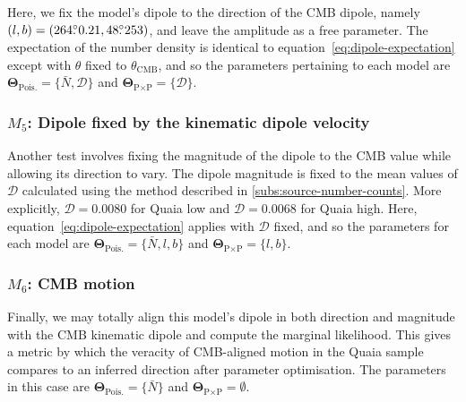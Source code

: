 \documentclass[fleqn,usenatbib]{mnras}
\newcommand{\dotdeg}{\rlap{.}^\circ}
\begin{document}
        Here, we fix the model's dipole to the direction of the CMB dipole, namely $(l,b) = (264\dotdeg0.21, 48\dotdeg253)$, and leave the amplitude as a free parameter. 
        The expectation of the number density is identical to equation~\eqref{eq:dipole-expectation} except with $\theta$ fixed to $\theta_\text{CMB}$, and so the parameters pertaining to each model are $\mathbf{\Theta}_{\text{Pois.}} = \{ \bar{N}, \mathcal{D} \}$ and $\mathbf{\Theta}_{\text{P}\times\text{P}} = \{ \mathcal{D} \}$.
        
    \subsubsection{$M_5$: Dipole fixed by the kinematic dipole velocity}
        \label{subs:direction}
        Another test involves fixing the magnitude of the dipole to the CMB value while allowing its direction to vary. 
        The dipole magnitude is fixed to the mean values of $\mathcal{D}$ calculated using the method described in \ref{subs:source-number-counts}.
        More explicitly,  $\mathcal{D} =  0.0080$ for Quaia low and $\mathcal{D} =  0.0068$ for Quaia high.
        Here, equation~\eqref{eq:dipole-expectation} applies with $\mathcal{D}$ fixed, and so the parameters for each model are $\mathbf{\Theta}_{\text{Pois.}} = \{ \bar{N}, l, b \}$ and $\mathbf{\Theta}_{\text{P}\times\text{P}} = \{ l, b \}$.

    \subsubsection{$M_6$: CMB motion}
        \label{subs:cmb-motion}
        Finally, we may totally align this model's dipole in both direction and magnitude with the CMB kinematic dipole and compute the marginal likelihood. 
        This gives a metric by which the veracity of CMB-aligned motion in the Quaia sample compares to an inferred direction after parameter optimisation.
        The parameters in this case are $\mathbf{\Theta}_{\text{Pois.}} = \{ \bar{N} \}$ and $\mathbf{\Theta}_{\text{P}\times\text{P}} = \emptyset$.
\end{document}
